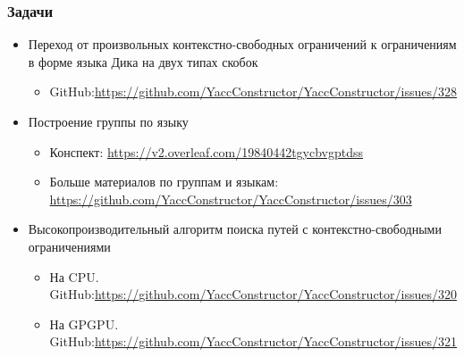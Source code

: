 \documentclass{beamer}
\begin{document}
\begin{frame}[fragile]
\transwipe[direction=90]
\frametitle{Задачи}
                 
  \begin{itemize}
    \item Переход от произвольных контекстно-свободных ограничений к ограничениям в форме языка 
    Дика на двух типах скобок 
    \begin{itemize}
         \item GitHub:\url{https://github.com/YaccConstructor/YaccConstructor/issues/328}
    \end{itemize}

    \item Построение группы по языку
    \begin{itemize}
         \item Конспект: \url{https://v2.overleaf.com/19840442tgycbvgptdss}
         \item Больше материалов по группам и языкам: \url{https://github.com/YaccConstructor/YaccConstructor/issues/303}
    \end{itemize}

    \item Высокопроизводительный алгоритм поиска путей с контекстно-свободными ограничениями
    \begin{itemize}
         \item На CPU. GitHub:\url{https://github.com/YaccConstructor/YaccConstructor/issues/320}
         \item На GPGPU. GitHub:\url{https://github.com/YaccConstructor/YaccConstructor/issues/321}
    \end{itemize}

  \end{itemize}
  
\end{frame}
\end{document}
